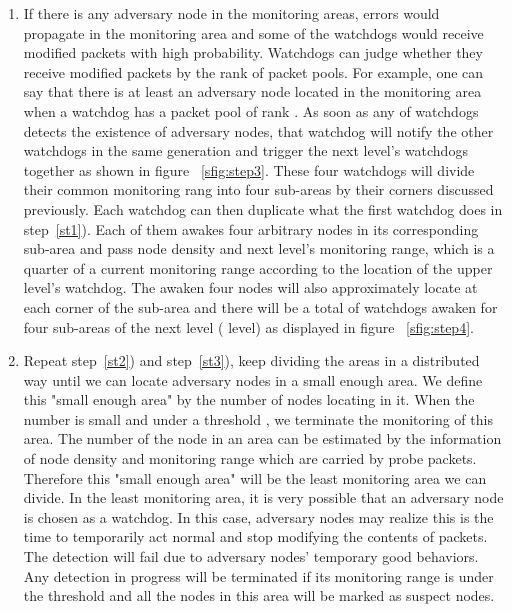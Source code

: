 \documentclass[conference]{IEEEtran}
\begin{document}
\begin{enumerate}
\item \label{st3}If there is any adversary node in the monitoring areas, errors would propagate in the monitoring area and some of the watchdogs would receive modified packets with high probability. Watchdogs can judge whether they receive modified packets by the rank of packet pools. For example, one can say that there is at least an adversary node located in the monitoring area when a watchdog has a packet pool of rank . As soon as any of watchdogs detects the existence of adversary nodes, that watchdog will notify the other watchdogs in the same generation and trigger the next level's watchdogs together as shown in figure ~\ref{sfig:step3}. These four watchdogs will divide their common monitoring rang into four sub-areas by their corners discussed previously. Each watchdog can then duplicate what the first watchdog does in step~\ref{st1}).  Each of them awakes four arbitrary nodes in its corresponding sub-area and pass node density and next level's monitoring range, which is a quarter of a current monitoring range according to the location of the upper level's watchdog. The awaken four nodes will also approximately locate at each corner of the sub-area and there will be a total of  watchdogs awaken for four sub-areas of the next level ( level) as displayed in figure ~\ref{sfig:step4}. \\
\item Repeat step~\ref{st2}) and step~\ref{st3}), keep dividing the areas in a distributed way until we can locate adversary nodes in a small enough area. We define this "small enough area" by the number of nodes locating in it. When the number is small and under a threshold , we terminate the monitoring of this area. The number of the node in an area can be estimated by the information of node density and monitoring range which are carried by probe packets. Therefore this "small enough area" will be the least monitoring area we can divide. In the least monitoring area, it is very possible that an adversary node is chosen as a watchdog. In this case, adversary nodes may realize this is the time to temporarily act normal and stop modifying the contents of packets. The detection will fail due to adversary nodes' temporary good behaviors. Any detection in progress will be terminated if its monitoring range is under the threshold and all the nodes in this area will be marked as suspect nodes.\\

\end{enumerate}
\end{document}
